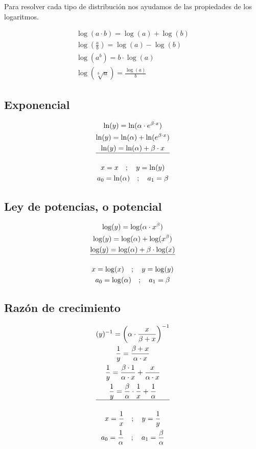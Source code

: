 Para resolver cada tipo de distribución nos ayudamos de las propiedades de los logaritmos.

\begin{gather}
    \log(a \cdot b) = \log(a) + \log(b)
    \\
    \log \left(\frac{a}{b}\right) = \log(a) - \log(b)
    \\
    \log(a^{b}) = b \cdot \log(a)
    \\
    \log(\sqrt[b]{a}) = \frac{\log(a)}{b}
\end{gather}

\subsection{Exponencial}

\begin{gather}
    \ln(y) = \ln(\alpha \cdot e^{\beta \cdot x})
    \\
    \ln(y) = \ln(\alpha) + \ln(e^{\beta \cdot x})
    \\
    \ln(y) = \ln(\alpha) + \beta \cdot x
    \\
    \hline
    \\
    x = x \quad;\quad y = \ln(y)
    \\
    a_{0} = \ln(\alpha) \quad;\quad a_{1} = \beta
\end{gather}

\subsection{Ley de potencias, o potencial}

\begin{gather}
    \log(y) = \log(\alpha \cdot x^{\beta})
    \\
    \log(y) = \log(\alpha) + \log(x^{\beta})
    \\
    \log(y) = \log(\alpha) + \beta \cdot \log(x)
    \\
    \hline
    \\
    x = \log(x) \quad;\quad y = \log(y)
    \\
    a_{0} = \log(\alpha) \quad;\quad a_{1} = \beta
\end{gather}

\subsection{Razón de crecimiento}

\begin{gather}
    (y)^{-1} = \left(\alpha \cdot \frac{x}{\beta + x}\right)^{-1}
    \\
    \frac{1}{y} = \frac{\beta + x}{\alpha \cdot x}
    \\
    \frac{1}{y} = \frac{\beta \cdot 1}{\alpha \cdot x} + \frac{x}{\alpha \cdot x}
    \\
    \frac{1}{y} = \frac{\beta}{\alpha} \cdot \frac{1}{x} + \frac{1}{\alpha}
    \\
    \hline
    \\
    x = \frac{1}{x} \quad;\quad y = \frac{1}{y}
    \\
    a_{0} = \frac{1}{\alpha} \quad;\quad a_{1} = \frac{\beta}{\alpha}
\end{gather}